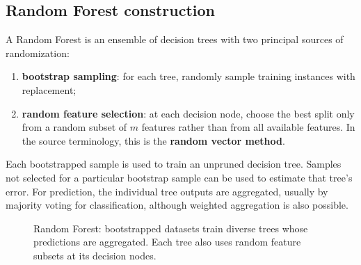 \documentclass[11pt,a4paper]{report}
\begin{document}
\subsection{Random Forest construction}

A Random Forest is an ensemble of decision trees with two principal sources of randomization:
\begin{enumerate}
  \item \textbf{bootstrap sampling}: for each tree, randomly sample training instances with replacement;
  \item \textbf{random feature selection}: at each decision node, choose the best split only from a random subset of $m$ features rather than from all available features. In the source terminology, this is the \textbf{random vector method}.
\end{enumerate}

Each bootstrapped sample is used to train an unpruned decision tree. Samples not selected for a particular bootstrap sample can be used to estimate that tree's error. For prediction, the individual tree outputs are aggregated, usually by majority voting for classification, although weighted aggregation is also possible.

\begin{figure}[H]
\centering
{}
\caption{Random Forest: bootstrapped datasets train diverse trees whose predictions are aggregated. Each tree also uses random feature subsets at its decision nodes.}
\label{fig:random-forest}
\end{figure}
\end{document}
